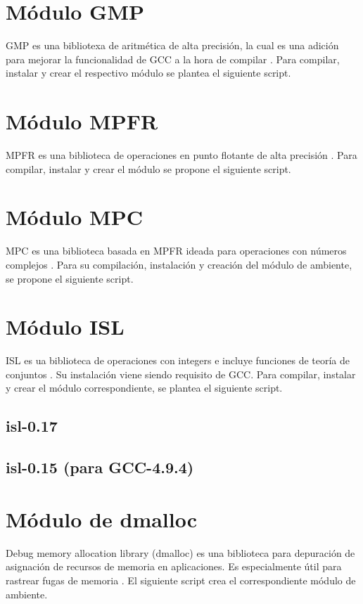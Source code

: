 

\section{Módulo GMP}
GMP es una bibliotexa de aritmética de alta precisión, la cual es una adición para mejorar la funcionalidad de GCC a la hora de compilar \cite{gmp}. Para compilar, instalar y crear el respectivo módulo se plantea el siguiente script.



\section{Módulo MPFR}
MPFR es una biblioteca de operaciones en punto flotante de alta precisión \cite{mpfr}. Para compilar, instalar y crear el módulo se propone el siguiente script.



\section{Módulo MPC}
MPC es una biblioteca basada en MPFR ideada para operaciones con números complejos \cite{mpc}. Para su compilación, instalación y creación del módulo de ambiente, se propone el siguiente script.



\section{Módulo ISL}
ISL es ua biblioteca de operaciones con integers e incluye funciones de teoría de conjuntos \cite{isl}. Su instalación viene siendo requisito de GCC. Para compilar, instalar y crear  el módulo correspondiente, se plantea el siguiente script.


\subsection{isl-0.17}


\subsection{isl-0.15 (para GCC-4.9.4)}


\section{Módulo de dmalloc}
Debug memory allocation library (dmalloc) es una biblioteca para depuración de asignación de recursos de memoria en aplicaciones. Es especialmente útil para rastrear fugas de memoria \cite{dmalloc}. El siguiente script crea el correspondiente módulo de ambiente.

